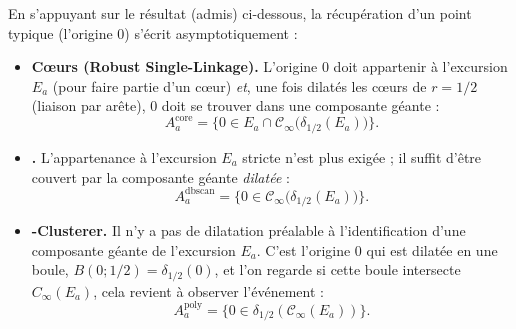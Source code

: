 
En s'appuyant sur %
le résultat (admis) ci-dessous, la récupération d'un point typique (l'origine $0$) s'écrit asymptotiquement :
\begin{itemize}
    \item \textbf{Cœurs (Robust Single-Linkage).} L'origine $0$ doit appartenir à l'excursion $E_a$ (pour faire partie d'un c\oe ur) \emph{et}, une fois dilatés les c\oe urs de $r=1/2$ (liaison par arête), $0$ doit se trouver dans une composante géante : 
    \[ A^{\mathrm{core}}_a = \bigl\{0\in E_a \cap \mathcal C_\infty\bigl(\delta_{1/2}(E_a)\bigr)\bigr\}.\]
    \item \textbf{\DBSCAN.} L'appartenance à l'excursion $E_a$ stricte n'est plus exigée ; il suffit d'être couvert par la composante géante \emph{dilatée} : 
    \[ A^{\mathrm{dbscan}}_a = \bigl\{0\in \mathcal C_\infty\bigl(\delta_{1/2}(E_a)\bigr)\bigr\}.\]
    \item \textbf{\HGP-Clusterer.} Il n'y a pas de dilatation préalable à l'identification d'une composante géante de l'excursion $E_a$. C'est l'origine $0$ qui est dilatée en une boule, $B(0 ; 1/2) = \delta_{1/2}(0)$, et l'on regarde si cette boule intersecte $C_\infty(E_a)$, cela revient à observer l'événement : 
    \[ A^{\mathrm{poly}}_a = \bigl\{0 \in  \delta_{1/2}\left( \mathcal C_\infty(E_a)\right)\bigr\}.\]
\end{itemize}


